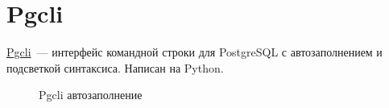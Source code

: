 \section{Pgcli}

\href{http://pgcli.com/}{Pgcli}~--- интерфейс командной строки для PostgreSQL с автозаполнением и подсветкой синтаксиса. Написан на Python.

\begin{figure}[ht!]
  \caption{Pgcli автозаполнение}
  \label{fig:pgcli_tables}
\end{figure}

